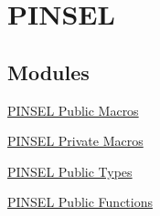 \hypertarget{group___p_i_n_s_e_l}{\section{\-P\-I\-N\-S\-E\-L}
\label{group___p_i_n_s_e_l}
}
\subsection*{\-Modules}
\begin{DoxyCompactItemize}
\item 
\hyperlink{group___p_i_n_s_e_l___public___macros}{\-P\-I\-N\-S\-E\-L Public Macros}
\item 
\hyperlink{group___p_i_n_s_e_l___private___macros}{\-P\-I\-N\-S\-E\-L Private Macros}
\item 
\hyperlink{group___p_i_n_s_e_l___public___types}{\-P\-I\-N\-S\-E\-L Public Types}
\item 
\hyperlink{group___p_i_n_s_e_l___public___functions}{\-P\-I\-N\-S\-E\-L Public Functions}
\end{DoxyCompactItemize}
